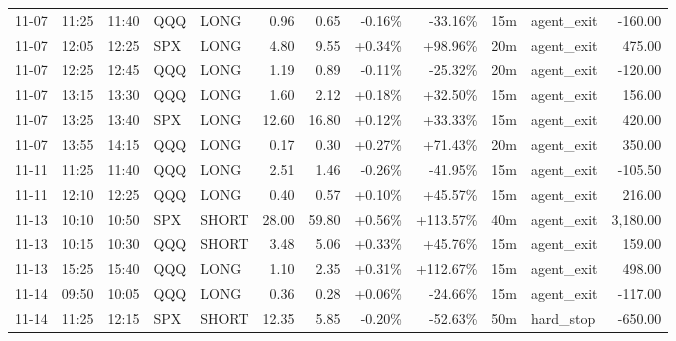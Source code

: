 \documentclass[11pt,a4paper]{article}
\begin{document}
\begin{center}
\begin{longtable}{>{\color{txtmain}}l l l l l r r r r r >{\color{txtmain}}l r}
11-07 & 11:25 & 11:40 & QQQ & LONG & 0.96 & 0.65 & \textcolor{lossred}{-0.16\%} & \textcolor{lossred}{-33.16\%} & 15m & agent\_exit & \textcolor{lossred}{-160.00} \\
11-07 & 12:05 & 12:25 & SPX & LONG & 4.80 & 9.55 & \textcolor{wingreen}{+0.34\%} & \textcolor{wingreen}{+98.96\%} & 20m & agent\_exit & \textcolor{wingreen}{475.00} \\
11-07 & 12:25 & 12:45 & QQQ & LONG & 1.19 & 0.89 & \textcolor{lossred}{-0.11\%} & \textcolor{lossred}{-25.32\%} & 20m & agent\_exit & \textcolor{lossred}{-120.00} \\
11-07 & 13:15 & 13:30 & QQQ & LONG & 1.60 & 2.12 & \textcolor{wingreen}{+0.18\%} & \textcolor{wingreen}{+32.50\%} & 15m & agent\_exit & \textcolor{wingreen}{156.00} \\
11-07 & 13:25 & 13:40 & SPX & LONG & 12.60 & 16.80 & \textcolor{wingreen}{+0.12\%} & \textcolor{wingreen}{+33.33\%} & 15m & agent\_exit & \textcolor{wingreen}{420.00} \\
11-07 & 13:55 & 14:15 & QQQ & LONG & 0.17 & 0.30 & \textcolor{wingreen}{+0.27\%} & \textcolor{wingreen}{+71.43\%} & 20m & agent\_exit & \textcolor{wingreen}{350.00} \\
11-11 & 11:25 & 11:40 & QQQ & LONG & 2.51 & 1.46 & \textcolor{lossred}{-0.26\%} & \textcolor{lossred}{-41.95\%} & 15m & agent\_exit & \textcolor{lossred}{-105.50} \\
11-11 & 12:10 & 12:25 & QQQ & LONG & 0.40 & 0.57 & \textcolor{wingreen}{+0.10\%} & \textcolor{wingreen}{+45.57\%} & 15m & agent\_exit & \textcolor{wingreen}{216.00} \\
11-13 & 10:10 & 10:50 & SPX & SHORT & 28.00 & 59.80 & \textcolor{wingreen}{+0.56\%} & \textcolor{wingreen}{+113.57\%} & 40m & agent\_exit & \textcolor{wingreen}{3,180.00} \\
11-13 & 10:15 & 10:30 & QQQ & SHORT & 3.48 & 5.06 & \textcolor{wingreen}{+0.33\%} & \textcolor{wingreen}{+45.76\%} & 15m & agent\_exit & \textcolor{wingreen}{159.00} \\
11-13 & 15:25 & 15:40 & QQQ & LONG & 1.10 & 2.35 & \textcolor{wingreen}{+0.31\%} & \textcolor{wingreen}{+112.67\%} & 15m & agent\_exit & \textcolor{wingreen}{498.00} \\
11-14 & 09:50 & 10:05 & QQQ & LONG & 0.36 & 0.28 & \textcolor{wingreen}{+0.06\%} & \textcolor{lossred}{-24.66\%} & 15m & agent\_exit & \textcolor{lossred}{-117.00} \\
11-14 & 11:25 & 12:15 & SPX & SHORT & 12.35 & 5.85 & \textcolor{lossred}{-0.20\%} & \textcolor{lossred}{-52.63\%} & 50m & hard\_stop & \textcolor{lossred}{-650.00} \\

\end{longtable}
\end{center}
\end{document}
